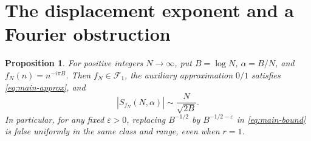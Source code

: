 \documentclass[11pt]{amsart}
\numberwithin{equation}{section}
\numberwithin{figure}{section}
\newtheorem{proposition}{Proposition}[section]
\theoremstyle{definition}
\newcommand{\eps}{\varepsilon}
\begin{document}
\section{The displacement exponent and a Fourier obstruction}\label{sec:sharpness}

\begin{proposition}\label{prop:sharpness}
For positive integers $N\to\infty$, put $B=\log N$, $\alpha=B/N$, and
$f_N(n)=n^{-i\pi B}$. Then $f_N\in\mathcal F_1$, the auxiliary
approximation $0/1$ satisfies \eqref{eq:main-approx}, and
\begin{equation}\label{eq:sharpness}
 |S_{f_N}(N,\alpha)|\sim\frac{N}{\sqrt{2B}}.
\end{equation}
In particular, for any fixed $\eps>0$, replacing $B^{-1/2}$
by $B^{-1/2-\eps}$ in \eqref{eq:main-bound} is false uniformly
in the same class and range, even when $r=1$.
\end{proposition}
\end{document}
